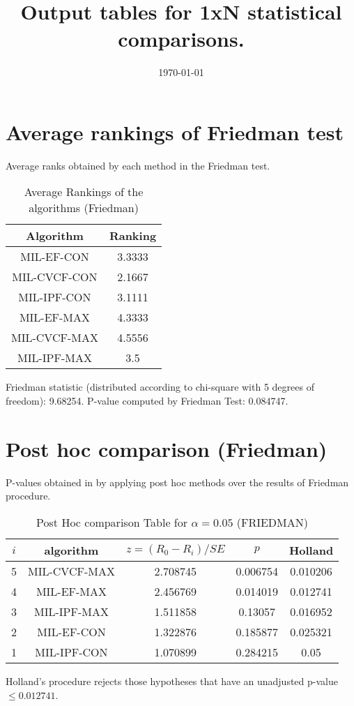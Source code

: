 \documentclass[a4paper,10pt]{article}
\title{Output tables for 1xN statistical comparisons.}
\author{}
\date{\today}
\begin{document}
\begin{landscape}
\pagestyle{empty}
\maketitle
\thispagestyle{empty}

\section{Average rankings of Friedman test}


Average ranks obtained by each method in the Friedman test.

\begin{table}[!htp]
\centering
\begin{tabular}{|c|c|}\hline
Algorithm&Ranking\\\hline
MIL-EF-CON&3.3333\\MIL-CVCF-CON&2.1667\\MIL-IPF-CON&3.1111\\MIL-EF-MAX&4.3333\\MIL-CVCF-MAX&4.5556\\MIL-IPF-MAX&3.5\\\hline\end{tabular}
\caption{Average Rankings of the algorithms (Friedman)}
\end{table}

Friedman statistic (distributed according to chi-square with 5 degrees of freedom): 9.68254. \newline P-value computed by Friedman Test: 0.084747.\newline


\newpage

\section{Post hoc comparison (Friedman)}


P-values obtained in by applying post hoc methods over the results of Friedman procedure.

\begin{table}[!htp]
\centering\footnotesize
\begin{tabular}{ccccc}
$i$&algorithm&$z=(R_0 - R_i)/SE$&$p$&Holland\\
\hline5&MIL-CVCF-MAX&2.708745&0.006754&0.010206\\4&MIL-EF-MAX&2.456769&0.014019&0.012741\\3&MIL-IPF-MAX&1.511858&0.13057&0.016952\\2&MIL-EF-CON&1.322876&0.185877&0.025321\\1&MIL-IPF-CON&1.070899&0.284215&0.05\\\hline
\end{tabular}
\caption{Post Hoc comparison Table for $\alpha=0.05$ (FRIEDMAN)}
\end{table}Holland's procedure rejects those hypotheses that have an unadjusted p-value $\le0.012741$.



\end{landscape}
\end{document}
